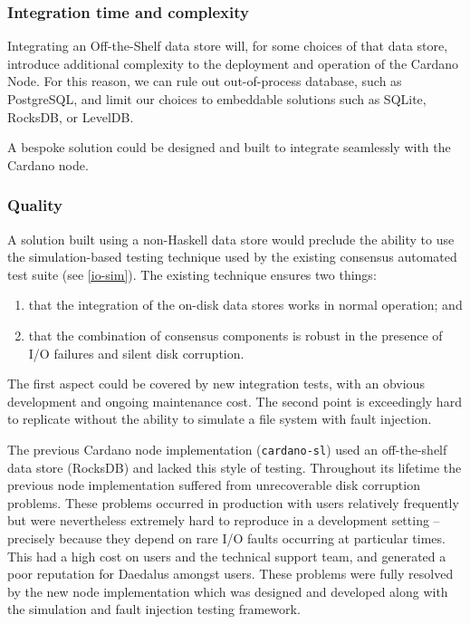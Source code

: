 \documentclass[11pt,a4paper]{article}
\begin{document}
\subsubsection{Integration time and complexity}

Integrating an Off-the-Shelf data store will, for some choices of that data
store, introduce additional complexity to the deployment and operation of the
Cardano Node. For this reason, we can rule out out-of-process database, such as
PostgreSQL, and limit our choices to embeddable solutions such as SQLite,
RocksDB, or LevelDB.

A bespoke solution could be designed and built to integrate seamlessly with the
Cardano node.

\subsubsection{Quality}
\label{quality}

A solution built using a non-Haskell data store would preclude the ability to
use the simulation-based testing technique used by the existing consensus
automated test suite (see \cref{io-sim}). The existing technique ensures two
things:
\begin{enumerate}
\item that the integration of the on-disk data stores works in normal operation;
      and
\item that the combination of consensus components is robust in the presence of
      I/O failures and silent disk corruption.
\end{enumerate}
The first aspect could be covered by new integration tests, with an obvious
development and ongoing maintenance cost. The second point is exceedingly hard
to replicate without the ability to simulate a file system with fault injection.

The previous Cardano node implementation ({\tt cardano-sl}) used an
off-the-shelf data store (RocksDB) and lacked this style of testing. Throughout
its lifetime the previous node implementation suffered from unrecoverable disk
corruption problems. These problems occurred in production with users
relatively frequently but were nevertheless extremely hard to reproduce in a
development setting -- precisely because they depend on rare I/O faults
occurring at particular times. This had a high cost on users and the technical
support team, and generated a poor reputation for Daedalus amongst users. These
problems were fully resolved by the new node implementation which was designed
and developed along with the simulation and fault injection testing framework.
\end{document}
